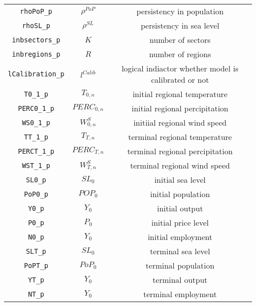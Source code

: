 \begin{center}
\begin{longtable}{ccc}
\texttt{rhoPoP\_p} & ${\rho^{PoP}}$ & persistency in population\\
\texttt{rhoSL\_p} & ${\rho^{SL}}$ & persistency in sea level\\
\texttt{inbsectors\_p} & ${K}$ & number of sectors\\
\texttt{inbregions\_p} & ${R}$ & number of regions\\
\texttt{lCalibration\_p} & ${l^{Calib}}$ & logical indiactor whether model is calibrated or not\\
\texttt{T0\_1\_p} & ${T_{0,n}}$ & initial regional temperature\\
\texttt{PERC0\_1\_p} & ${PERC_{0,n}}$ & initial regional percipitation\\
\texttt{WS0\_1\_p} & ${W^{S}_{0,n}}$ & initiial regional wind speed\\
\texttt{TT\_1\_p} & ${T_{T,n}}$ & terminal regional temperature\\
\texttt{PERCT\_1\_p} & ${PERC_{T,n}}$ & terminal regional percipitation\\
\texttt{WST\_1\_p} & ${W^{S}_{T,n}}$ & terminal regional wind speed\\
\texttt{SL0\_p} & ${SL_0}$ & initial sea level\\
\texttt{PoP0\_p} & ${POP_0}$ & initial population\\
\texttt{Y0\_p} & ${Y_0}$ & initial output\\
\texttt{P0\_p} & ${P_0}$ & initial price level\\
\texttt{N0\_p} & ${Y_0}$ & initial employment\\
\texttt{SLT\_p} & ${SL_0}$ & terminal sea level\\
\texttt{PoPT\_p} & ${PoP_0}$ & terminal population\\
\texttt{YT\_p} & ${Y_0}$ & terminal output\\
\texttt{NT\_p} & ${Y_0}$ & terminal employment\\
\hline%
\end{longtable}
\end{center}
